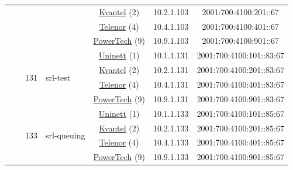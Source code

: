 \begin{small}
\begin{center}
\begin{longtable}{|c|c|c|c|c|c|c|c|}
  &  & \multicolumn{2}{|c|}{} & \multicolumn{2}{|c|}{\tiny{\href{http://kvantel.no}{Kvantel} (2)}} & \tiny{10.2.1.103} & \tiny{2001:700:4100:201::67} \\* \cline{5-5}\cline{6-6}\cline{7-7}\cline{8-8}
  &  & \multicolumn{2}{|c|}{} & \multicolumn{2}{|c|}{\tiny{\href{https://www.telenor.no}{Telenor} (4)}} & \tiny{10.4.1.103} & \tiny{2001:700:4100:401::67} \\* \cline{5-5}\cline{6-6}\cline{7-7}\cline{8-8}
  &  & \multicolumn{2}{|c|}{} & \multicolumn{2}{|c|}{\tiny{\href{http://www.powertech.no}{PowerTech} (9)}} & \tiny{10.9.1.103} & \tiny{2001:700:4100:901::67} \\* \cline{3-3}\cline{4-4}\cline{5-5}\cline{6-6}\cline{7-7}\cline{8-8}
  &  & \multirow{4}{*}{\tiny{131}} & \multicolumn{1}{|l|}{\multirow{4}{*}{\tiny{srl-test}}} & \multicolumn{2}{|c|}{\tiny{\href{https://www.uninett.no}{Uninett} (1)}} & \tiny{10.1.1.131} & \tiny{2001:700:4100:101::83:67} \\* \cline{5-5}\cline{6-6}\cline{7-7}\cline{8-8}
  &  &  &  & \multicolumn{2}{|c|}{\tiny{\href{http://kvantel.no}{Kvantel} (2)}} & \tiny{10.2.1.131} & \tiny{2001:700:4100:201::83:67} \\* \cline{5-5}\cline{6-6}\cline{7-7}\cline{8-8}
  &  &  &  & \multicolumn{2}{|c|}{\tiny{\href{https://www.telenor.no}{Telenor} (4)}} & \tiny{10.4.1.131} & \tiny{2001:700:4100:401::83:67} \\* \cline{5-5}\cline{6-6}\cline{7-7}\cline{8-8}
  &  &  &  & \multicolumn{2}{|c|}{\tiny{\href{http://www.powertech.no}{PowerTech} (9)}} & \tiny{10.9.1.131} & \tiny{2001:700:4100:901::83:67} \\* \cline{3-3}\cline{4-4}\cline{5-5}\cline{6-6}\cline{7-7}\cline{8-8}
  &  & \multirow{4}{*}{\tiny{133}} & \multicolumn{1}{|l|}{\multirow{4}{*}{\tiny{srl-queuing}}} & \multicolumn{2}{|c|}{\tiny{\href{https://www.uninett.no}{Uninett} (1)}} & \tiny{10.1.1.133} & \tiny{2001:700:4100:101::85:67} \\* \cline{5-5}\cline{6-6}\cline{7-7}\cline{8-8}
  &  &  &  & \multicolumn{2}{|c|}{\tiny{\href{http://kvantel.no}{Kvantel} (2)}} & \tiny{10.2.1.133} & \tiny{2001:700:4100:201::85:67} \\* \cline{5-5}\cline{6-6}\cline{7-7}\cline{8-8}
  &  &  &  & \multicolumn{2}{|c|}{\tiny{\href{https://www.telenor.no}{Telenor} (4)}} & \tiny{10.4.1.133} & \tiny{2001:700:4100:401::85:67} \\* \cline{5-5}\cline{6-6}\cline{7-7}\cline{8-8}
  &  &  &  & \multicolumn{2}{|c|}{\tiny{\href{http://www.powertech.no}{PowerTech} (9)}} & \tiny{10.9.1.133} & \tiny{2001:700:4100:901::85:67} \\* \cline{3-3}\cline{4-4}\cline{5-5}\cline{6-6}\cline{7-7}\cline{8-8}

\end{longtable}
\end{center}
\end{small}
